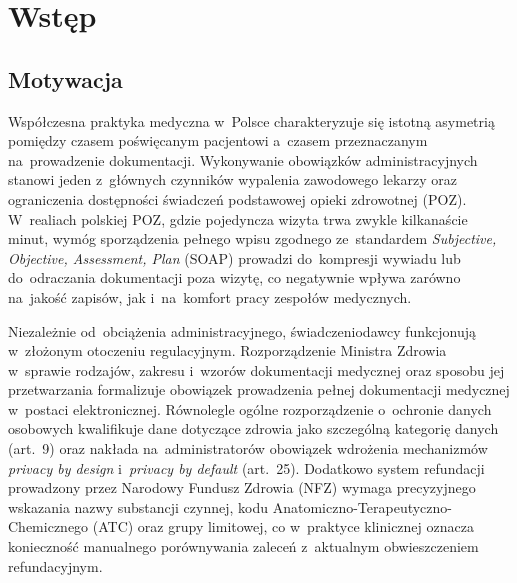 \chapter{Wstęp}\label{ch:wstep}


\section{Motywacja}\label{sec:motywacja}

Współczesna praktyka medyczna w~Polsce charakteryzuje się istotną
asymetrią pomiędzy czasem poświęcanym pacjentowi a~czasem przeznaczanym
na~prowadzenie dokumentacji. Wykonywanie obowiązków administracyjnych
stanowi jeden z~głównych czynników wypalenia zawodowego lekarzy
oraz ograniczenia dostępności świadczeń podstawowej opieki zdrowotnej
(POZ).
W~realiach polskiej POZ, gdzie pojedyncza wizyta trwa zwykle
kilkanaście minut, wymóg sporządzenia pełnego wpisu zgodnego ze~standardem
\emph{Subjective, Objective, Assessment, Plan} (SOAP) \parencite{weed1968soap}
prowadzi do~kompresji wywiadu lub do~odraczania dokumentacji poza wizytę,
co negatywnie wpływa zarówno na~jakość zapisów, jak i~na~komfort pracy
zespołów medycznych.

Niezależnie od~obciążenia administracyjnego, świadczeniodawcy
funkcjonują w~złożonym otoczeniu regulacyjnym. Rozporządzenie Ministra
Zdrowia w~sprawie rodzajów, zakresu i~wzorów dokumentacji medycznej
oraz sposobu jej przetwarzania
formalizuje obowiązek prowadzenia pełnej dokumentacji medycznej
w~postaci elektronicznej. Równolegle ogólne rozporządzenie o~ochronie
danych osobowych \parencite{gdpr2016} kwalifikuje dane dotyczące zdrowia
jako szczególną kategorię danych (art.~9) oraz nakłada na~administratorów
obowiązek wdrożenia mechanizmów \emph{privacy by design} i~\emph{privacy
by default} (art.~25). Dodatkowo system refundacji prowadzony przez
Narodowy Fundusz Zdrowia (NFZ) wymaga precyzyjnego wskazania nazwy
substancji czynnej, kodu Anatomiczno-Terapeutyczno-Chemicznego (ATC)
oraz grupy limitowej, co w~praktyce klinicznej oznacza konieczność
manualnego porównywania zaleceń z~aktualnym obwieszczeniem refundacyjnym.

